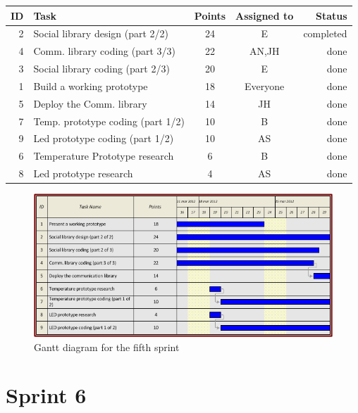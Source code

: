 \begin{table}[ht!]
\begin{tabular}{ | r | l | c |c | r | }

\hline
\textbf{ID} & \textbf{Task} & \textbf{Points} & \textbf{Assigned to} & \textbf{Status} \\
\hline

 2 & Social library design (part 2/2)			& 24 & E 		& completed \\
\hline
 4 & Comm. library coding (part 3/3)			& 22 & AN,JH	& done \\
\hline
 3 & Social library coding (part 2/3)			& 20 & E		& done \\
\hline
 1 & Build a working prototype					& 18 & Everyone	& done \\
\hline
 5 & Deploy the Comm. library					& 14 & JH		& done \\
\hline
 7 & Temp. prototype coding (part 1/2)			& 10 & B 		& done \\
\hline
 9 & Led prototype coding (part 1/2)			& 10 & AS 		& done \\
\hline
 6 & Temperature Prototype research				& 6  & B 		& done \\
\hline
 8 & Led prototype research						& 4  & AS 		& done \\
\hline

\end{tabular}
\end{table}

\begin{figure}[h!]
\centering \includegraphics[scale=0.8]{img/sprints-gantt5.png}
\caption{Gantt diagram for the fifth sprint}
\label{fig:sprints-gantt5}
\end{figure}

\newpage

\section{Sprint 6}

